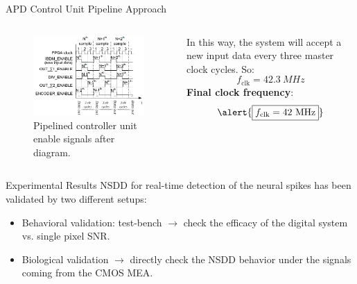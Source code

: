 \documentclass{beamer}
\begin{document}
\begin{frame}{APD Control Unit Pipeline Approach}
    \begin{columns}
        \begin{column}{0.5\textwidth}
            \begin{figure}
                \includegraphics[width=\textwidth]{Images_Rocco/Pipeline.png}
                \caption{Pipelined controller unit enable signals after diagram.}
                \label{fig:AR_Pipeline}
            \end{figure}
        \end{column}
        \hspace{-0.2cm}
        \begin{column}{0.5\textwidth}
            In this way, the system will accept a new input data every three master clock cycles. So:
            \[
                f_{\mathrm{clk}} = 42.3 \ \si{MHz}
            \]
            {\bf Final clock frequency}:
            \[
                \alert{\boxed{f_{\mathrm{clk}} = 42 \ \si{MHz}}}
            \]
        \end{column}
    \end{columns}
\end{frame}

\begin{frame}{Experimental Results}
NSDD for real-time detection of the neural spikes has been validated by two different setups:
\begin{itemize}
    \item \alert{Behavioral validation}: test-bench $\rightarrow$ check the efficacy of the digital system vs. single pixel SNR.
    
    \item \alert{Biological validation} $\rightarrow$ directly check the NSDD behavior under the signals coming from the CMOS MEA.
\end{itemize}

\end{frame}
\end{document}
